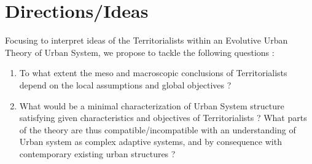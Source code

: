 \documentclass{article}
\begin{document}
\section{Directions/Ideas}

% 


Focusing to interpret ideas of the Territorialists within an Evolutive Urban Theory of Urban System, we propose to tackle the following questions : 


\begin{enumerate}
\item To what extent the meso and macroscopic conclusions of Territorialists depend on the local assumptions and global objectives ?
\item What would be a minimal characterization of Urban System structure satisfying given characteristics and objectives of Territorialists ? What parts of the theory are thus compatible/incompatible with an understanding of Urban system as complex adaptive systems, and by consequence with contemporary existing urban structures ? 
\end{enumerate}














\end{document}
